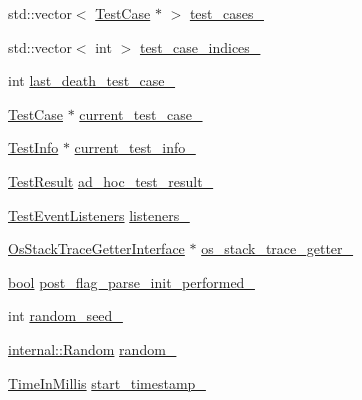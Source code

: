 \begin{DoxyCompactItemize}
\item 
std\+::vector$<$ \hyperlink{classtesting_1_1TestCase}{Test\+Case} $\ast$ $>$ \hyperlink{classtesting_1_1internal_1_1UnitTestImpl_a79ec0f733ada2898efd1a7fbd8587fb3}{test\+\_\+cases\+\_\+}
\item 
std\+::vector$<$ int $>$ \hyperlink{classtesting_1_1internal_1_1UnitTestImpl_a9b30891f1a9d5b5c25de2bef0f0bb49a}{test\+\_\+case\+\_\+indices\+\_\+}
\item 
int \hyperlink{classtesting_1_1internal_1_1UnitTestImpl_afd663a104bb0a6df2c5143454f78e305}{last\+\_\+death\+\_\+test\+\_\+case\+\_\+}
\item 
\hyperlink{classtesting_1_1TestCase}{Test\+Case} $\ast$ \hyperlink{classtesting_1_1internal_1_1UnitTestImpl_a3b346729d3940f065e05c69c434ebb3f}{current\+\_\+test\+\_\+case\+\_\+}
\item 
\hyperlink{classtesting_1_1TestInfo}{Test\+Info} $\ast$ \hyperlink{classtesting_1_1internal_1_1UnitTestImpl_a56128aac0fb5be45993715d1130b0610}{current\+\_\+test\+\_\+info\+\_\+}
\item 
\hyperlink{classtesting_1_1TestResult}{Test\+Result} \hyperlink{classtesting_1_1internal_1_1UnitTestImpl_a15355228a7140a08f9e2f333aa934ccd}{ad\+\_\+hoc\+\_\+test\+\_\+result\+\_\+}
\item 
\hyperlink{classtesting_1_1TestEventListeners}{Test\+Event\+Listeners} \hyperlink{classtesting_1_1internal_1_1UnitTestImpl_a16c3caa0bac1a8dce650649760de30d2}{listeners\+\_\+}
\item 
\hyperlink{classtesting_1_1internal_1_1OsStackTraceGetterInterface}{Os\+Stack\+Trace\+Getter\+Interface} $\ast$ \hyperlink{classtesting_1_1internal_1_1UnitTestImpl_a16b34d9194ca9552f581e472e9b18494}{os\+\_\+stack\+\_\+trace\+\_\+getter\+\_\+}
\item 
\hyperlink{classbool}{bool} \hyperlink{classtesting_1_1internal_1_1UnitTestImpl_ab4c7d8a9ff3edbd8a98f91c4afaf3bb8}{post\+\_\+flag\+\_\+parse\+\_\+init\+\_\+performed\+\_\+}
\item 
int \hyperlink{classtesting_1_1internal_1_1UnitTestImpl_a0afcc95308ebfacb8d0f53790e77e1ab}{random\+\_\+seed\+\_\+}
\item 
\hyperlink{classtesting_1_1internal_1_1Random}{internal\+::\+Random} \hyperlink{classtesting_1_1internal_1_1UnitTestImpl_a08551d7ff0ebb976ec82294ded8113ea}{random\+\_\+}
\item 
\hyperlink{namespacetesting_1_1internal_a66a845df404b38fe85c5e14a069f255a}{Time\+In\+Millis} \hyperlink{classtesting_1_1internal_1_1UnitTestImpl_a2114799ed634ee849b9dcd9728f9b7b6}{start\+\_\+timestamp\+\_\+}

\end{DoxyCompactItemize}
